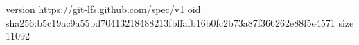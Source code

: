 version https://git-lfs.github.com/spec/v1
oid sha256:b5c19ac9a55bd70413218488213fbffafb16b0fc2b73a87f366262e88f5e4571
size 11092
